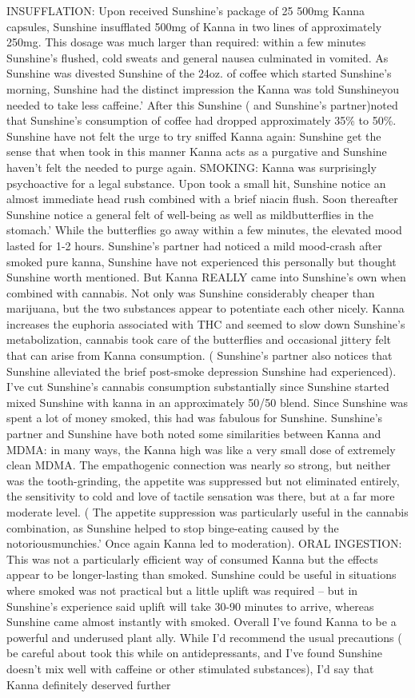 \documentclass[12pt]{book}
\begin{document}
INSUFFLATION: Upon received Sunshine's package of 25 500mg Kanna capsules, Sunshine insufflated 500mg of Kanna in two lines of approximately 250mg. This dosage was much larger than required: within a few minutes Sunshine's flushed, cold sweats and general nausea culminated in vomited. As Sunshine was divested Sunshine of the 24oz. of coffee which started Sunshine's morning, Sunshine had the distinct impression the Kanna was told Sunshineyou needed to take less caffeine.' After this Sunshine ( and Sunshine's partner)noted that Sunshine's consumption of coffee had dropped approximately 35\% to 50\%. Sunshine have not felt the urge to try sniffed Kanna again: Sunshine get the sense that when took in this manner Kanna acts as a purgative and Sunshine haven't felt the needed to purge again. SMOKING: Kanna was surprisingly psychoactive for a legal substance. Upon took a small hit, Sunshine notice an almost immediate head rush combined with a brief niacin flush. Soon thereafter Sunshine notice a general felt of well-being as well as mildbutterflies in the stomach.' While the butterflies go away within a few minutes, the elevated mood lasted for 1-2 hours. Sunshine's partner had noticed a mild mood-crash after smoked pure kanna, Sunshine have not experienced this personally but thought Sunshine worth mentioned. But Kanna REALLY came into Sunshine's own when combined with cannabis. Not only was Sunshine considerably cheaper than marijuana, but the two substances appear to potentiate each other nicely. Kanna increases the euphoria associated with THC and seemed to slow down Sunshine's metabolization, cannabis took care of the butterflies and occasional jittery felt that can arise from Kanna consumption. ( Sunshine's partner also notices that Sunshine alleviated the brief post-smoke depression Sunshine had experienced). I've cut Sunshine's cannabis consumption substantially since Sunshine started mixed Sunshine with kanna in an approximately 50/50 blend. Since Sunshine was spent a lot of money smoked, this had was fabulous for Sunshine. Sunshine's partner and Sunshine have both noted some similarities between Kanna and MDMA: in many ways, the Kanna high was like a very small dose of extremely clean MDMA. The empathogenic connection was nearly so strong, but neither was the tooth-grinding, the appetite was suppressed but not eliminated entirely, the sensitivity to cold and love of tactile sensation was there, but at a far more moderate level. ( The appetite suppression was particularly useful in the cannabis combination, as Sunshine helped to stop binge-eating caused by the notoriousmunchies.' Once again Kanna led to moderation). ORAL INGESTION: This was not a particularly efficient way of consumed Kanna but the effects appear to be longer-lasting than smoked. Sunshine could be useful in situations where smoked was not practical but a little uplift was required -- but in Sunshine's experience said uplift will take 30-90 minutes to arrive, whereas Sunshine came almost instantly with smoked. Overall I've found Kanna to be a powerful and underused plant ally. While I'd recommend the usual precautions ( be careful about took this while on antidepressants, and I've found Sunshine doesn't mix well with caffeine or other stimulated substances), I'd say that Kanna definitely deserved further 
\end{document}
